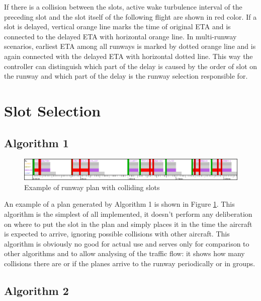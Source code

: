 If there is a collision between the slots, active wake turbulence interval of the preceding slot and the slot itself of the following flight are shown in red color. If a slot is delayed, vertical orange line marks the time of original ETA and is connected to the delayed ETA with horizontal orange line. In multi-runway scenarios, earliest ETA among all runways is marked by dotted orange line and is again connected with the delayed ETA with horizontal dotted line. This way the controller can distinguish which part of the delay is caused by the order of slot on the runway and which part of the delay is the runway selection responsible for.

\section{Slot Selection}

\label{section:slot-selection}


\subsection{Algorithm 1}

\begin{figure}[h]
    \centering
    \includegraphics[width=\textwidth]{figures/rwy-in-place.png}
    \caption{Example of runway plan with colliding slots}
    \label{fig:rwy-in-place}
\end{figure}

An example of a plan generated by Algorithm 1 is shown in Figure \ref{fig:rwy-in-place}. This algorithm is the simplest of all implemented, it doesn't perform any deliberation on where to put the slot in the plan and simply places it in the time the aircraft is expected to arrive, ignoring possible collisions with other aircraft. This algorithm is obviously no good for actual use and serves only for comparison to other algorithms and to allow analysing of the traffic flow: it shows how many collisions there are or if the planes arrive to the runway periodically or in groups.

\subsection{Algorithm 2}


